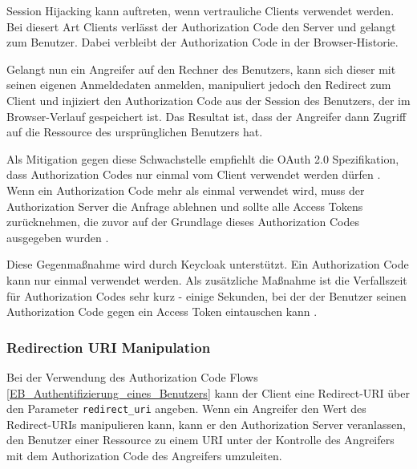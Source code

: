 
Session Hijacking kann auftreten, wenn vertrauliche Clients verwendet werden. Bei diesert Art Clients verlässt der Authorization Code den Server und gelangt zum Benutzer. Dabei verbleibt der Authorization Code in der Browser-Historie.

Gelangt nun ein Angreifer auf den Rechner des Benutzers, kann sich dieser mit seinen eigenen Anmeldedaten anmelden, manipuliert jedoch den Redirect zum Client und injiziert den Authorization Code aus der Session des Benutzers, der im Browser-Verlauf gespeichert ist. Das Resultat ist, dass der Angreifer dann Zugriff auf die Ressource des ursprünglichen Benutzers hat.

Als Mitigation gegen diese Schwachstelle empfiehlt die OAuth 2.0 Spezifikation, dass Authorization Codes nur einmal vom Client verwendet werden dürfen \cite{SSEB_OAuthAuthorizationResponse}. Wenn ein Authorization Code mehr als einmal verwendet wird, muss der Authorization Server die Anfrage ablehnen und sollte alle Access Tokens zurücknehmen, die zuvor auf der Grundlage dieses Authorization Codes ausgegeben wurden \cite{SSEB_OAuthAuthorizationResponse}.

Diese Gegenmaßnahme wird durch Keycloak unterstützt. Ein Authorization Code kann nur einmal verwendet werden. Als zusätzliche Maßnahme ist die Verfallszeit für Authorization Codes sehr kurz - einige Sekunden, bei der der Benutzer seinen Authorization Code gegen ein Access Token eintauschen kann \cite[Sec. 19]{SSEB_keycloakDocs}.

\subsubsection{Redirection URI Manipulation}

Bei der Verwendung des Authorization Code Flows \ref{EB_Authentifizierung_eines_Benutzers} kann der Client eine Redirect-URI über den Parameter \texttt{redirect\_uri} angeben. Wenn ein Angreifer den Wert des Redirect-URIs manipulieren kann, kann er den Authorization Server veranlassen, den Benutzer einer Ressource zu einem URI unter der Kontrolle des Angreifers mit dem Authorization Code des Angreifers umzuleiten. \cite{SSEB_OAuthAuthorizationSecurityConsiderations}

